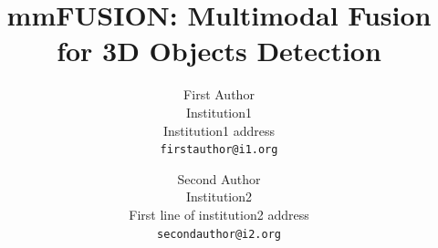 \documentclass[10pt,twocolumn,letterpaper]{article}
\begin{document}
\title{mmFUSION: Multimodal Fusion for 3D Objects Detection}

\author{First Author\\
Institution1\\
Institution1 address\\
{\tt\small firstauthor@i1.org}
\and
Second Author\\
Institution2\\
First line of institution2 address\\
{\tt\small secondauthor@i2.org}
}
\maketitle
\end{document}
